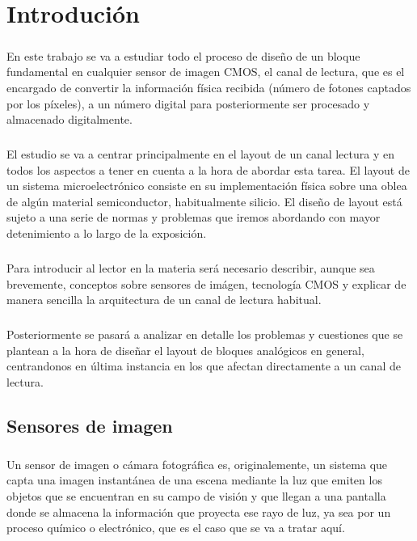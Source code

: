 \chapter{Introdución}

\paragraph{}
En este trabajo se va a estudiar todo el proceso de diseño de un bloque fundamental
en cualquier sensor de imagen CMOS, el canal de lectura, que es el encargado
de convertir la información física recibida (número de fotones captados por los
píxeles), a un número digital para posteriormente ser procesado y almacenado digitalmente.

\paragraph{}
El estudio se va a centrar principalmente en el layout de un canal
lectura y en todos los aspectos a tener en cuenta a la hora de abordar esta tarea.
El layout de un sistema microelectrónico consiste en su implementación física
sobre una oblea de algún material semiconductor, habitualmente silicio. El
diseño de layout está sujeto a una serie de normas y problemas que iremos abordando
con mayor detenimiento a lo largo de la exposición.

\paragraph{}
Para introducir al lector en la materia será necesario describir, aunque sea
brevemente, conceptos sobre sensores de imágen, tecnología CMOS y explicar de manera
sencilla la arquitectura de un canal de lectura habitual.

\paragraph{}
Posteriormente se pasará a analizar en detalle los problemas y cuestiones que se
plantean a la hora de diseñar el layout de bloques analógicos en general,
centrandonos en última instancia en los que afectan directamente a un canal de lectura.

\section{Sensores de imagen}

\paragraph{}
Un sensor de imagen o cámara fotográfica es, originalemente, un sistema que capta
una imagen instantánea de una escena mediante la luz que emiten los objetos que
se encuentran en su campo de visión y que llegan a una pantalla donde se almacena
la información que proyecta ese rayo de luz, ya sea por un proceso químico
o electrónico, que es el caso que se va a tratar aquí.

